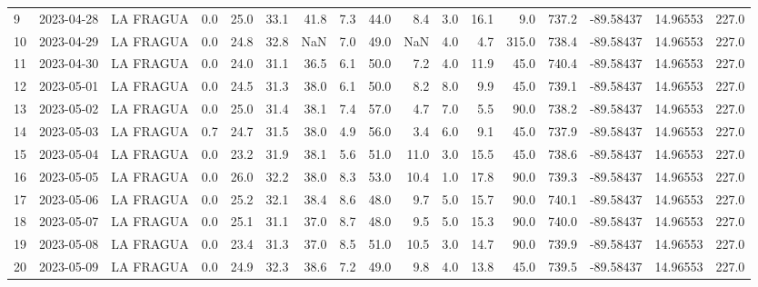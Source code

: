 \documentclass[12pt]{article}
\begin{document}
\begin{center}
\begin{tabular}{lllrrrrrrrrrrrrrr}
9   & 2023-04-28 &  LA FRAGUA &     0.0 &  25.0 &   33.1 &  41.8 &      7.3 &     44.0 &        8.4 &  3.0 &        16.1 &         9.0 &      737.2 & -89.58437 &  14.96553 &    227.0 \\
10  & 2023-04-29 &  LA FRAGUA &     0.0 &  24.8 &   32.8 &   NaN &      7.0 &     49.0 &        NaN &  4.0 &         4.7 &       315.0 &      738.4 & -89.58437 &  14.96553 &    227.0 \\
11  & 2023-04-30 &  LA FRAGUA &     0.0 &  24.0 &   31.1 &  36.5 &      6.1 &     50.0 &        7.2 &  4.0 &        11.9 &        45.0 &      740.4 & -89.58437 &  14.96553 &    227.0 \\
12  & 2023-05-01 &  LA FRAGUA &     0.0 &  24.5 &   31.3 &  38.0 &      6.1 &     50.0 &        8.2 &  8.0 &         9.9 &        45.0 &      739.1 & -89.58437 &  14.96553 &    227.0 \\
13  & 2023-05-02 &  LA FRAGUA &     0.0 &  25.0 &   31.4 &  38.1 &      7.4 &     57.0 &        4.7 &  7.0 &         5.5 &        90.0 &      738.2 & -89.58437 &  14.96553 &    227.0 \\
14  & 2023-05-03 &  LA FRAGUA &     0.7 &  24.7 &   31.5 &  38.0 &      4.9 &     56.0 &        3.4 &  6.0 &         9.1 &        45.0 &      737.9 & -89.58437 &  14.96553 &    227.0 \\
15  & 2023-05-04 &  LA FRAGUA &     0.0 &  23.2 &   31.9 &  38.1 &      5.6 &     51.0 &       11.0 &  3.0 &        15.5 &        45.0 &      738.6 & -89.58437 &  14.96553 &    227.0 \\
16  & 2023-05-05 &  LA FRAGUA &     0.0 &  26.0 &   32.2 &  38.0 &      8.3 &     53.0 &       10.4 &  1.0 &        17.8 &        90.0 &      739.3 & -89.58437 &  14.96553 &    227.0 \\
17  & 2023-05-06 &  LA FRAGUA &     0.0 &  25.2 &   32.1 &  38.4 &      8.6 &     48.0 &        9.7 &  5.0 &        15.7 &        90.0 &      740.1 & -89.58437 &  14.96553 &    227.0 \\
18  & 2023-05-07 &  LA FRAGUA &     0.0 &  25.1 &   31.1 &  37.0 &      8.7 &     48.0 &        9.5 &  5.0 &        15.3 &        90.0 &      740.0 & -89.58437 &  14.96553 &    227.0 \\
19  & 2023-05-08 &  LA FRAGUA &     0.0 &  23.4 &   31.3 &  37.0 &      8.5 &     51.0 &       10.5 &  3.0 &        14.7 &        90.0 &      739.9 & -89.58437 &  14.96553 &    227.0 \\
20  & 2023-05-09 &  LA FRAGUA &     0.0 &  24.9 &   32.3 &  38.6 &      7.2 &     49.0 &        9.8 &  4.0 &        13.8 &        45.0 &      739.5 & -89.58437 &  14.96553 &    227.0 \\

\end{tabular}
\end{center}
\end{document}
